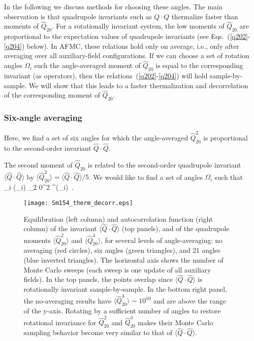 \documentclass[prc,twocolumn,aps,showpacs,floatfix,nofootinbib,letterpaper,preprintnumbers]{revtex4-1}
\begin{document}
In the following we discuss methods for choosing these angles. The main observation is that quadrupole invariants such as $Q \cdot Q$  thermalize faster than moments of $\hat Q_{20}$. For a rotationally invariant system, the low moments of $\hat Q_{20}$ are proportional to the expectation values of quadrupole invariants (see Eqs.~(\ref{q202}-\ref{q204}) below).  In AFMC, these relations hold only on average, i.e., only after averaging over all auxiliary-field configurations. If we can choose a set of rotation angles $\Omega_i$ such the angle-averaged moment of $\hat Q_{20}$ is equal to the corresponding invariant (as operators), then the relations~(\ref{q202}-\ref{q204}) will hold sample-by-sample. We will show that this leads to a faster thermalization and decorrelation of the corresponding moment of $\hat Q_{20}$.

\subsubsection{Six-angle averaging} \label{sixangles}

Here, we find a set of six angles for which the angle-averaged $\hat Q_{20}^2$ is proportional to the second-order invariant $\hat Q \cdot \hat Q$.

The second moment of $\hat Q_{20}$ is related to the second-order quadrupole invariant $\langle \hat Q \cdot \hat Q \rangle$ by $\langle \hat Q^2_{20} \rangle = \langle \hat Q \cdot \hat Q \rangle/5$. We would like to find a set of angles $\Omega_i$ such that
\be
\sum_i (\Omega_i) _{2 0}^2 ^{\dagger}(\Omega_i) \propto {} \cdot {} \,.
\ee

\begin{figure*}[t!]
 \texttt{[image: Sm154\_therm\_decorr.eps]}
 \caption{Equilibration (left column) and autocorrelation function (right column) of the  invariant $\langle \hat{Q} \cdot \hat{Q} \rangle$ (top panels), and of the quadrupole moments $\langle \hat{Q}_{20}^2 \rangle$ and $\langle \hat{Q}_{20}^3 \rangle$, for several levels of angle-averaging: no averaging (red circles), six angles (green triangles), and 21 angles (blue inverted triangles). The horizontal axis shows the number of Monte Carlo sweeps (each sweep is one update of all auxiliary fields). In the top panels, the points overlap since $\langle \hat{Q} \cdot \hat Q\rangle$ is rotationally invariant sample-by-sample. In the bottom right panel, the no-averaging results have $\langle \hat{Q}_{20}^3\rangle \sim 10^{10}$ and are above the range of the y-axis. Rotating by a sufficient number of angles to restore rotational invariance for $\hat Q_{20}^2$ and $\hat Q_{20}^3$ makes their Monte Carlo sampling behavior become very similar to that of $\langle \hat Q \cdot \hat Q \rangle$.}
 \label{sm_qtherm}
\end{figure*} 
\end{document}
